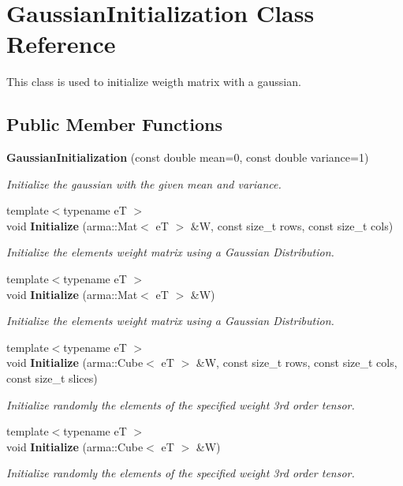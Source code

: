 \section{Gaussian\+Initialization Class Reference}
\label{classmlpack_1_1ann_1_1GaussianInitialization}


This class is used to initialize weigth matrix with a gaussian.  


\subsection*{Public Member Functions}
\begin{DoxyCompactItemize}
\item 
\textbf{ Gaussian\+Initialization} (const double mean=0, const double variance=1)
\begin{DoxyCompactList}\small\item\em Initialize the gaussian with the given mean and variance. \end{DoxyCompactList}\item 
{\footnotesize template$<$typename eT $>$ }\\void \textbf{ Initialize} (arma\+::\+Mat$<$ eT $>$ \&W, const size\+\_\+t rows, const size\+\_\+t cols)
\begin{DoxyCompactList}\small\item\em Initialize the elements weight matrix using a Gaussian Distribution. \end{DoxyCompactList}\item 
{\footnotesize template$<$typename eT $>$ }\\void \textbf{ Initialize} (arma\+::\+Mat$<$ eT $>$ \&W)
\begin{DoxyCompactList}\small\item\em Initialize the elements weight matrix using a Gaussian Distribution. \end{DoxyCompactList}\item 
{\footnotesize template$<$typename eT $>$ }\\void \textbf{ Initialize} (arma\+::\+Cube$<$ eT $>$ \&W, const size\+\_\+t rows, const size\+\_\+t cols, const size\+\_\+t slices)
\begin{DoxyCompactList}\small\item\em Initialize randomly the elements of the specified weight 3rd order tensor. \end{DoxyCompactList}\item 
{\footnotesize template$<$typename eT $>$ }\\void \textbf{ Initialize} (arma\+::\+Cube$<$ eT $>$ \&W)
\begin{DoxyCompactList}\small\item\em Initialize randomly the elements of the specified weight 3rd order tensor. \end{DoxyCompactList}\end{DoxyCompactItemize}



